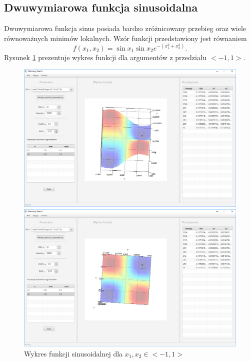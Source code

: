 \documentclass[10pt, a4paper]{article}
\begin{document}
\subsection{Dwuwymiarowa funkcja sinusoidalna}
\label{subsec:sin}
Dwuwymiarowa funkcja sinus posiada bardzo zróżnicowany przebieg oraz wiele równoważnych minimów lokalnych. Wzór funkcji przedstawiony jest równaniem $$f(x_{1},x_{2})=\sin{x_{1}}\sin{x_{2}}e^{-(x_{1}^2+x_{2}^2)}.$$ Rysunek \ref{fig:8} prezentuje wykres funkcji dla argumentów z przedziału $<-1,1>$.
\begin{figure}[htbp] 
	\begin{minipage}[b]{1\textwidth}
		\centering
		\includegraphics[width=\linewidth]{images/81.PNG}
	\end{minipage} 
	\begin{minipage}[b]{1\textwidth}
		\centering
		\includegraphics[width=\linewidth]{images/82.PNG} 
	\end{minipage}
	\caption{Wykres funkcji sinusoidalnej dla $x_{1}, x_{2} \in <-1,1>$}
	\label{fig:8}
\end{figure}
\end{document}

